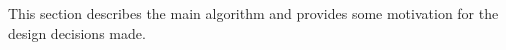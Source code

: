 This section describes the main algorithm and provides some motivation for the design decisions made.
